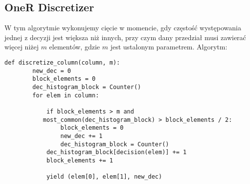 \documentclass[magisterska]{pracamgr}
\theoremstyle{plain}
\theoremstyle{definition}
\theoremstyle{remark}
\begin{document}
\subsection{OneR Discretizer}
W tym algorytmie wykonujemy cięcie w momencie, gdy częstość występowania
jednej z decyzji jest większa niż innych, przy czym dany przedział musi zawierać więcej niżej
$m$ elementów, gdzie $m$ jest ustalonym parametrem.
Algorytm:
\begin{lstlisting}
def discretize_column(column, m):
        new_dec = 0
        block_elements = 0
        dec_histogram_block = Counter()
        for elem in column:

            if block_elements > m and
	       most_common(dec_histogram_block) > block_elements / 2:
                block_elements = 0
                new_dec += 1
                dec_histogram_block = Counter()
            dec_histogram_block[decision(elem)] += 1
            block_elements += 1

            yield (elem[0], elem[1], new_dec)
\end{lstlisting}
\end{document}

